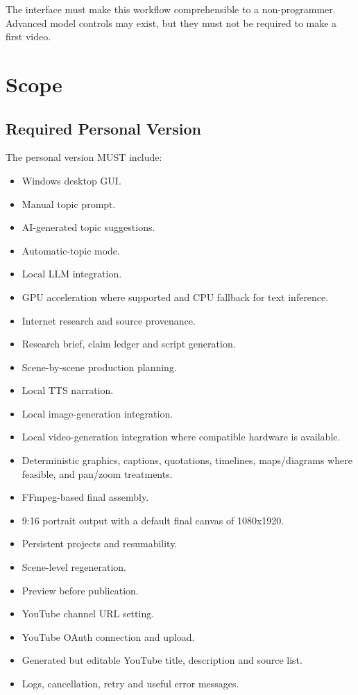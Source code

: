 \documentclass[10pt,journal,compsoc]{IEEEtran}
\begin{document}
The interface must make this workflow comprehensible to a non-programmer. Advanced model controls may exist, but they must not be required to make a first video.

\section{Scope}

\subsection{Required Personal Version}

The personal version MUST include:
\begin{itemize}
    \item Windows desktop GUI.
    \item Manual topic prompt.
    \item AI-generated topic suggestions.
    \item Automatic-topic mode.
    \item Local LLM integration.
    \item GPU acceleration where supported and CPU fallback for text inference.
    \item Internet research and source provenance.
    \item Research brief, claim ledger and script generation.
    \item Scene-by-scene production planning.
    \item Local TTS narration.
    \item Local image-generation integration.
    \item Local video-generation integration where compatible hardware is available.
    \item Deterministic graphics, captions, quotations, timelines, maps/diagrams where feasible, and pan/zoom treatments.
    \item FFmpeg-based final assembly.
    \item 9:16 portrait output with a default final canvas of 1080x1920.
    \item Persistent projects and resumability.
    \item Scene-level regeneration.
    \item Preview before publication.
    \item YouTube channel URL setting.
    \item YouTube OAuth connection and upload.
    \item Generated but editable YouTube title, description and source list.
    \item Logs, cancellation, retry and useful error messages.
\end{itemize}
\end{document}
